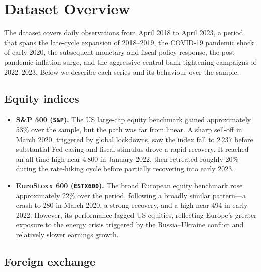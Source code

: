 \section{Dataset Overview}

The dataset covers daily observations from April 2018 to April 2023, a period
that spans the late-cycle expansion of 2018--2019, the COVID-19 pandemic shock
of early 2020, the subsequent monetary and fiscal policy response, the
post-pandemic inflation surge, and the aggressive central-bank tightening
campaigns of 2022--2023. Below we describe each series and its behaviour over
the sample.

\subsection*{Equity indices}

\begin{itemize}
  \item \textbf{S\&P 500 (\texttt{S\&P}).}
    The US large-cap equity benchmark gained approximately 53\% over the
    sample, but the path was far from linear. A sharp sell-off in March 2020,
    triggered by global lockdowns, saw the index fall to 2\,237 before
    substantial Fed easing and fiscal stimulus drove a rapid recovery. It
    reached an all-time high near 4\,800 in January 2022, then retreated
    roughly 20\% during the rate-hiking cycle before partially recovering into
    early 2023.

  \item \textbf{EuroStoxx 600 (\texttt{ESTX600}).}
    The broad European equity benchmark rose approximately 22\% over the
    period, following a broadly similar pattern---a crash to 280 in March 2020,
    a strong recovery, and a high near 494 in early 2022. However, its
    performance lagged US equities, reflecting Europe's greater exposure to the
    energy crisis triggered by the Russia--Ukraine conflict and relatively
    slower earnings growth.
\end{itemize}

\subsection*{Foreign exchange}

